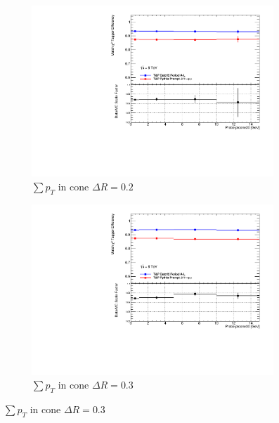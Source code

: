 \begin{figure}[phtb]
  \centering
    \begin{subfigure}[b]{0.55\textwidth}
      \includegraphics[width=\textwidth]{PartCalibration2012/Plots/SFPlots/ptcone20_smt.pdf}
      \caption{$\sum p_{T}$ in cone $\Delta R=0.2$} \label{fig:CalibrationIsoPtcone20}
    \end{subfigure}
    
    \begin{subfigure}[b]{0.55\textwidth}
      \includegraphics[width=\textwidth]{PartCalibration2012/Plots/SFPlots/ptcone30_smt.pdf}
      \caption{$\sum p_{T}$ in cone $\Delta R=0.3$} \label{fig:CalibrationIsoPtcone30}
    \end{subfigure}
    

\end{figure}
